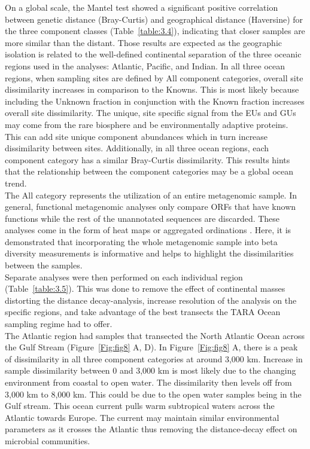 On a global scale, the Mantel test showed a significant positive correlation between genetic distance (Bray-Curtis) and geographical distance (Haversine) for the three component classes (Table~\ref{table:3.4}), indicating that closer samples are more similar than the distant. Those results are expected as the geographic isolation is related to the well-defined continental separation of the three oceanic regions used in the analyses: Atlantic, Pacific, and Indian. In all three ocean regions, when sampling sites are defined by All component categories, overall site dissimilarity increases in comparison to the Knowns. This is most likely because including the Unknown fraction in conjunction with the Known fraction increases overall site dissimilarity. The unique, site specific signal from the EUs and GUs may come from the rare biosphere and be environmentally adaptive proteins. This can add site unique component abundances which in turn increase dissimilarity between sites. Additionally, in all three ocean regions, each component category has a similar Bray-Curtis dissimilarity. This results hints that the relationship between the component categories may be a global ocean trend.\\

The All category represents the utilization of an entire metagenomic sample. In general, functional metagenomic analyses only compare ORFs that have known functions while the rest of the unannotated sequences are discarded. These analyses come in the form of heat maps \citep{McMahon_2015} or aggregated ordinations \citep{Louca_2016}. Here, it is demonstrated that incorporating the whole metagenomic sample into beta diversity measurements is informative and helps to highlight the dissimilarities between the samples.\\

Separate analyses were then performed on each individual region (Table~\ref{table:3.5}). This was done to remove the effect of continental masses distorting the distance decay-analysis, increase resolution of the analysis on the specific regions, and take advantage of the best transects the TARA Ocean sampling regime had to offer.\\

The Atlantic region had samples that transected the North Atlantic Ocean across the Gulf Stream (Figure~\ref{Fig:fig8} A, D). In Figure~\ref{Fig:fig8} A, there is a peak of dissimilarity in all three component categories at around 3,000 km. Increase in sample dissimilarity between 0 and 3,000 km is most likely due to the changing environment from coastal to open water. The dissimilarity then levels off from 3,000 km to 8,000 km. This could be due to the open water samples being in the Gulf stream. This ocean current pulls warm subtropical waters across the Atlantic towards Europe. The current may maintain similar environmental parameters as it crosses the Atlantic thus removing the distance-decay effect on microbial communities.\\

